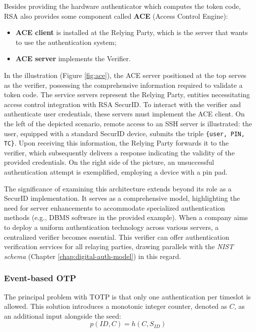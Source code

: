 Besides providing the hardware authenticator which computes the token code,
RSA also provides some component called \textbf{ACE} (Access Control Engine):
\begin{itemize}
  \item \textbf{ACE client} is installed at the Relying Party, which is the server that wants to use the authentication system;
  \item \textbf{ACE server} implements the Verifier.
\end{itemize}
In the illustration (Figure \ref{fig:ace}), the ACE server positioned at the top serves as the verifier, possessing the comprehensive information required to validate a token code. The service servers represent the Relying Party, entities necessitating access control integration with RSA SecurID. To interact with the verifier and authenticate user credentials, these servers must implement the ACE client. On the left of the depicted scenario, remote access to an SSH server is illustrated: the user, equipped with a standard SecurID device, submits the triple \texttt{\{user, PIN, TC\}}. Upon receiving this information, the Relying Party forwards it to the verifier, which subsequently delivers a response indicating the validity of the provided credentials. On the right side of the picture, an unsuccessful authentication attempt is exemplified, employing a device with a pin pad.

The significance of examining this architecture extends beyond its role as a SecurID implementation. It serves as a comprehensive model, highlighting the need for server enhancements to accommodate specialized authentication methods (e.g., DBMS software in the provided example). When a company aims to deploy a uniform authentication technology across various servers, a centralized verifier becomes essential. This verifier can offer authentication verification services for all relaying parties, drawing parallels with the \textit{NIST schema} (Chapter \ref{chap:digital-auth-model}) in this regard.



\subsubsection{Event-based OTP}
The principal problem with TOTP is that only one authentication per timeslot is allowed.
This solution introduces a monotonic integer counter, denoted as $C$, as an additional input alongside the seed:
\[
  p(ID, C) = h(C, S_{ID})
\]


